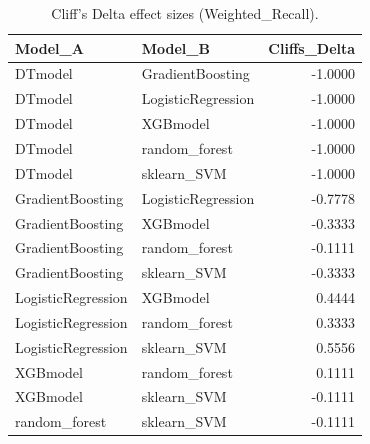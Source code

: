 \begin{table}[t]
\centering
\begin{tabular}{llr}
\toprule
Model_A & Model_B & Cliffs_Delta \\
\midrule
DTmodel & GradientBoosting & -1.0000 \\
DTmodel & LogisticRegression & -1.0000 \\
DTmodel & XGBmodel & -1.0000 \\
DTmodel & random_forest & -1.0000 \\
DTmodel & sklearn_SVM & -1.0000 \\
GradientBoosting & LogisticRegression & -0.7778 \\
GradientBoosting & XGBmodel & -0.3333 \\
GradientBoosting & random_forest & -0.1111 \\
GradientBoosting & sklearn_SVM & -0.3333 \\
LogisticRegression & XGBmodel & 0.4444 \\
LogisticRegression & random_forest & 0.3333 \\
LogisticRegression & sklearn_SVM & 0.5556 \\
XGBmodel & random_forest & 0.1111 \\
XGBmodel & sklearn_SVM & -0.1111 \\
random_forest & sklearn_SVM & -0.1111 \\
\bottomrule
\end{tabular}
\caption{Cliff's Delta effect sizes (Weighted_Recall).}
\label{tab:cliffs_Weighted_Recall}
\end{table}